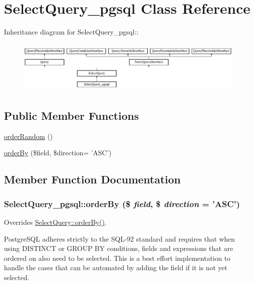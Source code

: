 \hypertarget{classSelectQuery__pgsql}{
\section{SelectQuery\_\-pgsql Class Reference}
\label{classSelectQuery__pgsql}
}
Inheritance diagram for SelectQuery\_\-pgsql::\begin{figure}[H]
\begin{center}
\leavevmode
\includegraphics[height=2.57471cm]{classSelectQuery__pgsql}
\end{center}
\end{figure}
\subsection*{Public Member Functions}
\begin{DoxyCompactItemize}
\item 
\hyperlink{classSelectQuery__pgsql_a2aac16a64fec955bf8313aabdcad0fec}{orderRandom} ()
\item 
\hyperlink{classSelectQuery__pgsql_adb1134a3498b05b32a33787418d68f8c}{orderBy} (\$field, \$direction= 'ASC')
\end{DoxyCompactItemize}


\subsection{Member Function Documentation}
\hypertarget{classSelectQuery__pgsql_adb1134a3498b05b32a33787418d68f8c}{
\subsubsection[{orderBy}]{\setlength{\rightskip}{0pt plus 5cm}SelectQuery\_\-pgsql::orderBy (\$ {\em field}, \/  \$ {\em direction} = {\ttfamily 'ASC'})}}
\label{classSelectQuery__pgsql_adb1134a3498b05b32a33787418d68f8c}
Overrides \hyperlink{classSelectQuery_a32ede93f2abfd7f8bc388d0c00512fae}{SelectQuery::orderBy()}.

PostgreSQL adheres strictly to the SQL-\/92 standard and requires that when using DISTINCT or GROUP BY conditions, fields and expressions that are ordered on also need to be selected. This is a best effort implementation to handle the cases that can be automated by adding the field if it is not yet selected.


